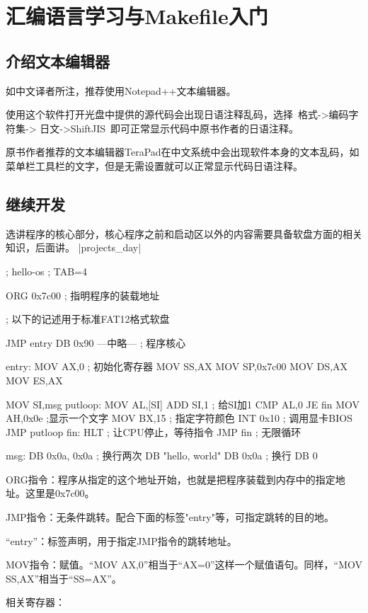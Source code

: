 ﻿\chapter{	汇编语言学习与Makefile入门	}
\section{	介绍文本编辑器	}
如中文译者所注，推荐使用Notepad++文本编辑器。

使用这个软件打开光盘中提供的源代码会出现日语注释乱码，选择~格式->编码字符集-> 日文->ShiftJIS~即可正常显示代码中原书作者的日语注释。

原书作者推荐的文本编辑器TeraPad在中文系统中会出现软件本身的文本乱码，如菜单栏工具栏的文字，但是无需设置就可以正常显示代码日语注释。

\section{	继续开发	}
选讲程序的核心部分，核心程序之前和启动区以外的内容需要具备软盘方面的相关知识，后面讲。
\dag |projects_day|
\begin{code}[label=helloos.nas]
; hello-os
; TAB=4

		ORG		0x7c00			; 指明程序的装载地址

; 以下的记述用于标准FAT12格式软盘

		JMP		entry
		DB		0x90
---中略---
; 程序核心

entry:
		MOV		AX,0			; 初始化寄存器
		MOV		SS,AX
		MOV		SP,0x7c00
		MOV		DS,AX
		MOV		ES,AX

		MOV		SI,msg
putloop:
		MOV		AL,[SI]
		ADD		SI,1			; 给SI加1
		CMP		AL,0
		JE		fin
		MOV		AH,0x0e			;显示一个文字
		MOV		BX,15			; 指定字符颜色
		INT		0x10			; 调用显卡BIOS
		JMP		putloop
fin:
		HLT						; 让CPU停止，等待指令
		JMP		fin				; 无限循环

msg:
		DB		0x0a, 0x0a		; 换行两次
		DB		"hello, world"
		DB		0x0a			; 换行
		DB		0
\end{code}
\cs

ORG指令：程序从指定的这个地址开始，也就是把程序装载到内存中的指定地址。这里是0x7c00。

JMP指令：无条件跳转。配合下面的标签"entry"等，可指定跳转的目的地。

“entry”：标签声明，用于指定JMP指令的跳转地址。

MOV指令：赋值。“MOV AX,0”相当于“AX=0”这样一个赋值语句。同样，“MOV SS,AX”相当于“SS=AX”。
\cs

相关寄存器：

